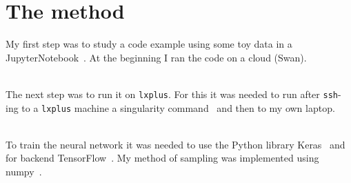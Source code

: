 \section{The method}
\label{sec:Method}

My first step was to study a code example using some toy data in a JupyterNotebook~\cite{glazov}. At the beginning I ran the code on a cloud (Swan). 

\ \\The next step was to run it on \texttt{lxplus}. For this it was needed to run after \texttt{ssh}-ing to a \texttt{lxplus} machine a singularity command~\cite{Singularity} and then to my own laptop.

\ \\To train the neural network it was needed to use the Python library Keras~\cite{keras} and for backend TensorFlow~\cite{tensorflow}. My method of sampling was implemented using numpy~\cite{numpy}.
